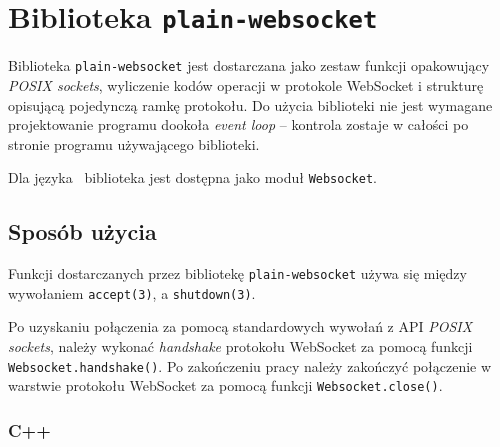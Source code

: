 \chapter{Biblioteka \texttt{plain-websocket}}
\label{plain_websocket_library}

Biblioteka \texttt{plain-websocket} jest dostarczana jako zestaw funkcji
opakowujący \emph{POSIX sockets}, wyliczenie kodów operacji w protokole
WebSocket i strukturę opisującą pojedynczą ramkę protokołu. Do użycia biblioteki
nie jest wymagane projektowanie programu dookoła \emph{event loop} -- kontrola
zostaje w całości po stronie programu używającego biblioteki.

Dla języka \ViuAct\ biblioteka jest dostępna jako moduł \texttt{Websocket}.

\section{Sposób użycia}

Funkcji dostarczanych przez bibliotekę \texttt{plain-websocket} używa się między
wywołaniem \texttt{accept(3)}, a \texttt{shutdown(3)}.

Po uzyskaniu połączenia za pomocą standardowych wywołań z API \emph{POSIX
sockets}, należy wykonać \emph{handshake} protokołu WebSocket za pomocą funkcji
\texttt{Websocket.handshake()}. Po zakończeniu pracy należy zakończyć połączenie
w warstwie protokołu WebSocket za pomocą funkcji \texttt{Websocket.close()}.

\subsection{C++}

